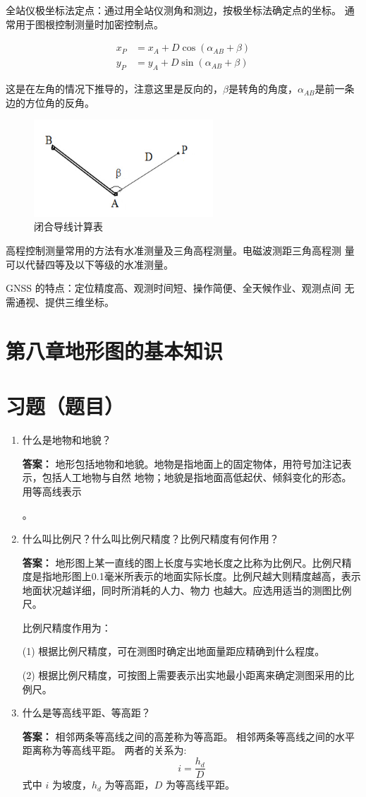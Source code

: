 \documentclass[12pt,a4paper]{article}
\newcounter{question}
\newenvironment{questions}{
    \setcounter{question}{0}
    \section*{习题（题目）}
    \begin{enumerate}[leftmargin=1.5em,label={\arabic*．}]
}{
    \end{enumerate}
}
\newcommand{\answer}[1]{\par\noindent\textbf{答案：} #1\par\vspace{1em}}
\begin{document}
全站仪极坐标法定点：通过用全站仪测角和测边，按极坐标法确定点的坐标。
通常用于图根控制测量时加密控制点。

\begin{align*}
x_P &= x_A + D\cos(\alpha_{AB} + \beta) \\
y_P &= y_A + D\sin(\alpha_{AB} + \beta)
\end{align*}

这是在左角的情况下推导的，{\color{red}注意这里是反向的，$\beta$是转角的角度，$\alpha_{AB}$是前一条边的方位角的反角。}

\begin{figure}[H]
    \centering
    \includegraphics[width=0.6\textwidth]{./figures/12.png}
    \caption{闭合导线计算表}
\end{figure}


高程控制测量常用的方法有水准测量及三角高程测量。电磁波测距三角高程测
量可以代替四等及以下等级的水准测量。 

GNSS 的特点：定位精度高、观测时间短、操作简便、全天候作业、观测点间
无需通视、提供三维坐标。

\newpage

\section*{第八章\quad 地形图的基本知识}

\begin{questions}
    \item 什么是地物和地貌？
    
    \answer{地形包括地物和地貌。地物是指地面上的固定物体，{\color{red}用符号加注记表示}，包括人工地物与自然
地物；地貌是指地面高低起伏、倾斜变化的形态。{\color{red}用等高线表示} }。

    \item 什么叫比例尺？什么叫比例尺精度？比例尺精度有何作用？
    
    \answer{地形图上某一直线的图上长度与实地长度之比称为比例尺。比例尺精度是指地形图上0.1毫米所表示的地面实际长度。比例尺越大则精度越高，表示地面状况越详细，同时所消耗的人力、物力
也越大。应选用适当的测图比例尺。

比例尺精度作用为：

(1) 根据比例尺精度，可在测图时确定出地面量距应精确到什么程度。

(2) 根据比例尺精度，可按图上需要表示出实地最小距离来确定测图采用的比例尺。}
    
    \item 什么是等高线平距、等高距？
    
    \answer{
    相邻两条等高线之间的高差称为等高距。
相邻两条等高线之间的水平距离称为等高线平距。
两者的关系为:
\[ i = \frac{h_d}{D} \]
式中 \( i \) 为坡度，\( h_d \) 为等高距，\( D \) 为等高线平距。
    }
\end{questions}
\end{document}
